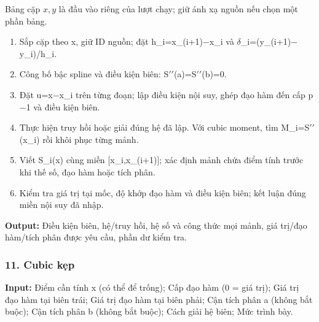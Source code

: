 Bảng cặp $x,y$ là đầu vào riêng của lượt chạy; giữ ánh xạ nguồn nếu chọn một phần bảng.

\begin{enumerate}

\item Sắp cặp theo x,\allowbreak{} giữ ID nguồn;\allowbreak{} đặt h\_i=\allowbreak{}x\_(\allowbreak{}i+\allowbreak{}1)\ensuremath{-}x\_i và \ensuremath{\delta}\_i=\allowbreak{}(\allowbreak{}y\_(\allowbreak{}i+\allowbreak{}1)\ensuremath{-}y\_i)/\allowbreak{}h\_i.

\item Công bố bậc spline và điều kiện biên: S\ensuremath{\prime\prime}(\allowbreak{}a)=\allowbreak{}S\ensuremath{\prime\prime}(\allowbreak{}b)=\allowbreak{}0.

\item Đặt u=\allowbreak{}x\ensuremath{-}x\_i trên từng đoạn;\allowbreak{} lập điều kiện nội suy,\allowbreak{} ghép đạo hàm đến cấp p\ensuremath{-}1 và điều kiện biên.

\item Thực hiện truy hồi hoặc giải đúng hệ đã lập. Với cubic moment,\allowbreak{} tìm M\_i=\allowbreak{}S\ensuremath{\prime\prime}(\allowbreak{}x\_i) rồi khôi phục từng mảnh.

\item Viết S\_i(\allowbreak{}x) cùng miền [x\_i,\allowbreak{}x\_(\allowbreak{}i+\allowbreak{}1)];\allowbreak{} xác định mảnh chứa điểm tính trước khi thế số,\allowbreak{} đạo hàm hoặc tích phân.

\item Kiểm tra giá trị tại mốc,\allowbreak{} độ khớp đạo hàm và điều kiện biên;\allowbreak{} kết luận đúng miền nội suy đã nhập.

\end{enumerate}

\textbf{Output:} Điều kiện biên,\allowbreak{} hệ/\allowbreak{}truy hồi,\allowbreak{} hệ số và công thức mọi mảnh,\allowbreak{} giá trị/\allowbreak{}đạo hàm/\allowbreak{}tích phân được yêu cầu,\allowbreak{} phần dư kiểm tra.

\examplebreak\subsubsection*{11. Cubic kẹp}

\textbf{Input:} Điểm cần tính x (\allowbreak{}có thể để trống);\allowbreak{} Cấp đạo hàm (\allowbreak{}0 =\allowbreak{} giá trị);\allowbreak{} Giá trị đạo hàm tại biên trái;\allowbreak{} Giá trị đạo hàm tại biên phải;\allowbreak{} Cận tích phân a (\allowbreak{}không bắt buộc);\allowbreak{} Cận tích phân b (\allowbreak{}không bắt buộc);\allowbreak{} Cách giải hệ biên;\allowbreak{} Mức trình bày.

